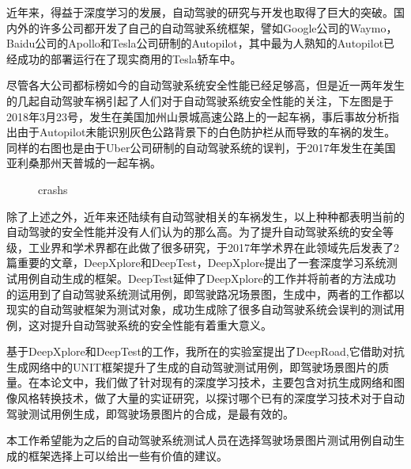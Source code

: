 \begin{cabstract}

近年来，得益于深度学习的发展，自动驾驶的研究与开发也取得了巨大的突破。国内外的许多公司都开发了自己的自动驾驶系统框架，譬如Google公司的Waymo，Baidu公司的Apollo和Tesla公司研制的Autopilot，其中最为人熟知的Autopilot已经成功的部署运行在了现实商用的Tesla轿车中。

尽管各大公司都标榜如今的自动驾驶系统安全性能已经足够高，但是近一两年发生的几起自动驾驶车祸引起了人们对于自动驾驶系统安全性能的关注，下左图是于2018年3月23号，发生在美国加州山景城高速公路上的一起车祸，事后事故分析指出由于Autopilot未能识别灰色公路背景下的白色防护栏从而导致的车祸的发生。同样的右图也是由于Uber公司研制的自动驾驶系统的误判，于2017年发生在美国亚利桑那州天普城的一起车祸。

\begin{figure}[h]
  \centering
  \caption{crashs}
\end{figure}

除了上述之外，近年来还陆续有自动驾驶相关的车祸发生，以上种种都表明当前的自动驾驶的安全性能并没有人们认为的那么高。为了提升自动驾驶系统的安全等级，工业界和学术界都在此做了很多研究，于2017年学术界在此领域先后发表了2篇重要的文章，DeepXplore\cite{DeepXplore}和DeepTest\cite{DeepTest}，DeepXplore提出了一套深度学习系统测试用例自动生成的框架。DeepTest延伸了DeepXplore的工作并将前者的方法成功的运用到了自动驾驶系统测试用例，即驾驶路况场景图，生成中，两者的工作都以现实的自动驾驶框架为测试对象，成功生成除了很多自动驾驶系统会误判的测试用例，这对提升自动驾驶系统的安全性能有着重大意义。

基于DeepXplore和DeepTest的工作，我所在的实验室提出了DeepRoad\cite{DeepRoad},它借助对抗生成网络\cite{GAN}中的UNIT\cite{UNIT}框架提升了生成的自动驾驶测试用例，即驾驶场景图片的质量。在本论文中，我们做了针对现有的深度学习技术，主要包含对抗生成网络和图像风格转换技术，做了大量的实证研究，以探讨哪个已有的深度学习技术对于自动驾驶测试用例生成，即驾驶场景图片的合成，是最有效的。

本工作希望能为之后的自动驾驶系统测试人员在选择驾驶场景图片测试用例自动生成的框架选择上可以给出一些有价值的建议。

\end{cabstract}

